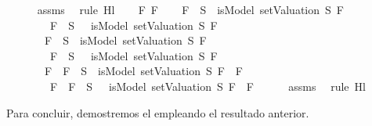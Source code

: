 \begin{isabellebody}
\ \ \ \ \isamarkupfalse%
\ assms\ \isamarkupfalse%
\ {\isacharparenleft}rule\ Hl{}{\isacharunderscore}{}{\isacharparenright}\isanewline
{}\isamarkupfalse%
\isanewline
\ \ \isamarkupfalse%
\ F{}\ F{}\isanewline
\ \ \isamarkupfalse%
\ {\isachardoublequoteopen}{\isacharparenleft}F{}\ {\isasymin}\ S\ {\isasymlongrightarrow}\ isModel\ {\isacharparenleft}setValuation\ S{\isacharparenright}\ F{}{\isacharparenright}\ {\isasymand}\isanewline
\ \ \ \ \ \ \ {\isacharparenleft}\isactrlbold {\isasymnot}\ F{}\ {\isasymin}\ S\ {\isasymlongrightarrow}\ {\isasymnot}\ isModel\ {\isacharparenleft}setValuation\ S{\isacharparenright}\ F{}{\isacharparenright}\ {\isasymLongrightarrow}\isanewline
\ \ \ \ \ \ \ {\isacharparenleft}F{}\ {\isasymin}\ S\ {\isasymlongrightarrow}\ isModel\ {\isacharparenleft}setValuation\ S{\isacharparenright}\ F{}{\isacharparenright}\ {\isasymand}\isanewline
\ \ \ \ \ \ \ {\isacharparenleft}\isactrlbold {\isasymnot}\ F{}\ {\isasymin}\ S\ {\isasymlongrightarrow}\ {\isasymnot}\ isModel\ {\isacharparenleft}setValuation\ S{\isacharparenright}\ F{}{\isacharparenright}\ {\isasymLongrightarrow}\isanewline
\ \ \ \ \ \ \ {\isacharparenleft}F{}\ \isactrlbold {\isasymrightarrow}\ F{}\ {\isasymin}\ S\ {\isasymlongrightarrow}\ isModel\ {\isacharparenleft}setValuation\ S{\isacharparenright}\ {\isacharparenleft}F{}\ \isactrlbold {\isasymrightarrow}\ F{}{\isacharparenright}{\isacharparenright}\ {\isasymand}\isanewline
\ \ \ \ \ \ \ {\isacharparenleft}\isactrlbold {\isasymnot}\ {\isacharparenleft}F{}\ \isactrlbold {\isasymrightarrow}\ F{}{\isacharparenright}\ {\isasymin}\ S\ {\isasymlongrightarrow}\ {\isasymnot}\ isModel\ {\isacharparenleft}setValuation\ S{\isacharparenright}\ {\isacharparenleft}F{}\ \isactrlbold {\isasymrightarrow}\ F{}{\isacharparenright}{\isacharparenright}{\isachardoublequoteclose}\isanewline
\ \ \ \ \isamarkupfalse%
\ assms\ \isamarkupfalse%
\ {\isacharparenleft}rule\ Hl{}{\isacharunderscore}{}{\isacharparenright}\isanewline
{}\isamarkupfalse%
%
\endisatagproof
{\isafoldproof}%
%
\isadelimproof
%
\endisadelimproof
%
\begin{isamarkuptext}%
Para concluir, demostremos el  empleando el
  resultado anterior.


\end{isamarkuptext}
\end{isabellebody}
